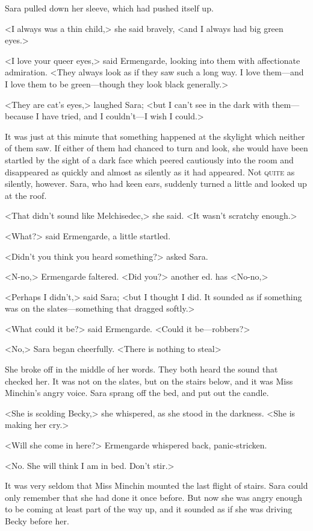 Sara pulled down her sleeve, which had pushed itself up.

<I always was a thin child,> she said bravely, <and I always had big green eyes.>

<I love your queer eyes,> said Ermengarde, looking into them with affectionate admiration. <They always look as if they saw such a long way. I love them—and I love them to be green—though they look black generally.>

<They are cat's eyes,> laughed Sara; <but I can't see in the dark with them—because I have tried, and I couldn't—I wish I could.>

It was just at this minute that something happened at the skylight which neither of them saw. If either of them had chanced to turn and look, she would have been startled by the sight of a dark face which peered cautiously into the room and disappeared as quickly and almost as silently as it had appeared. Not \textsc{quite} as silently, however. Sara, who had keen ears, suddenly turned a little and looked up at the roof.

<That didn't sound like Melchisedec,> she said. <It wasn't scratchy enough.>

<What?> said Ermengarde, a little startled.

<Didn't you think you heard something?> asked Sara.

<N-no,> Ermengarde faltered. <Did you?> {another ed. has <No-no,>}

<Perhaps I didn't,> said Sara; <but I thought I did. It sounded as if something was on the slates—something that dragged softly.>

<What could it be?> said Ermengarde. <Could it be—robbers?>

<No,> Sara began cheerfully. <There is nothing to steal\longdash>

She broke off in the middle of her words. They both heard the sound that checked her. It was not on the slates, but on the stairs below, and it was Miss Minchin's angry voice. Sara sprang off the bed, and put out the candle.

<She is scolding Becky,> she whispered, as she stood in the darkness. <She is making her cry.>

<Will she come in here?> Ermengarde whispered back, panic-stricken.

<No. She will think I am in bed. Don't stir.>

It was very seldom that Miss Minchin mounted the last flight of stairs. Sara could only remember that she had done it once before. But now she was angry enough to be coming at least part of the way up, and it sounded as if she was driving Becky before her.

